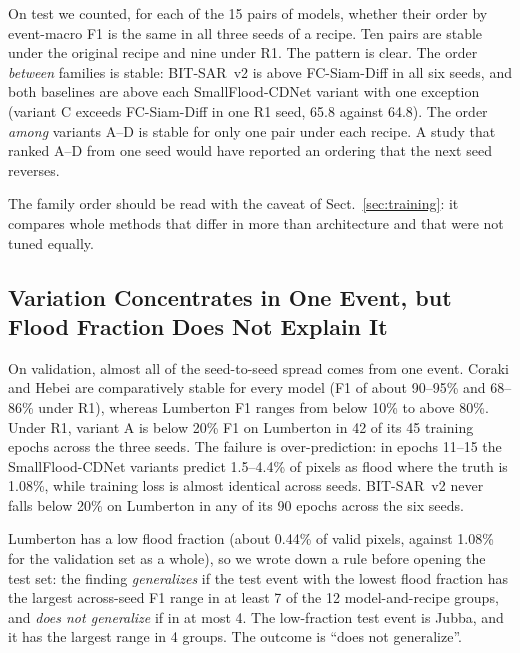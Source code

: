 \documentclass[runningheads]{llncs}
\begin{document}
On test we counted, for each of the 15 pairs of models, whether their order by event-macro F1
is the same in all three seeds of a recipe. Ten pairs are stable under the original recipe
and nine under R1. The pattern is clear. The order \emph{between} families is stable:
BIT-SAR~v2 is above FC-Siam-Diff in all six seeds, and both baselines are above each
SmallFlood-CDNet variant with one exception (variant C exceeds FC-Siam-Diff in one R1 seed,
65.8 against 64.8). The order \emph{among} variants A--D is stable for only one pair under
each recipe. A study that ranked A--D from one seed would have reported an ordering that the
next seed reverses.

The family order should be read with the caveat of Sect.~\ref{sec:training}: it compares
whole methods that differ in more than architecture and that were not tuned equally.

\subsection{Variation Concentrates in One Event, but Flood Fraction Does Not Explain It}
\label{sec:events}

On validation, almost all of the seed-to-seed spread comes from one event. Coraki and Hebei
are comparatively stable for every model (F1 of about 90--95\% and 68--86\% under R1), whereas Lumberton F1 ranges from
below 10\% to above 80\%. Under R1, variant A is below 20\% F1 on Lumberton in 42 of its 45
training epochs across the three seeds. The failure is over-prediction: in epochs 11--15 the
SmallFlood-CDNet variants predict 1.5--4.4\% of pixels as flood where the truth is 1.08\%,
while training loss is almost identical across seeds. BIT-SAR~v2 never falls below 20\% on
Lumberton in any of its 90 epochs across the six seeds.

Lumberton has a low flood fraction (about 0.44\% of valid pixels, against 1.08\% for the
validation set as a whole), so we wrote down a rule before opening the test set: the finding \emph{generalizes} if the test event with the
lowest flood fraction has the largest across-seed F1 range in at least 7 of the 12
model-and-recipe groups, and \emph{does not generalize} if in at most 4. The low-fraction
test event is Jubba, and it has the largest range in 4 groups. The outcome is ``does not
generalize''.
\end{document}
